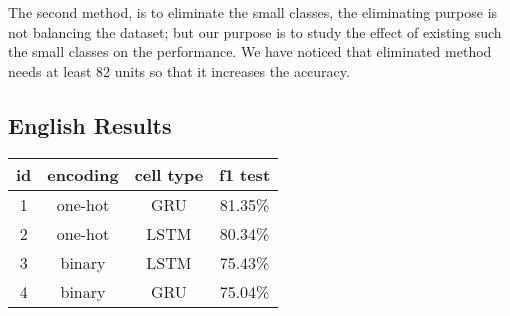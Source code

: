   
The second method, is to eliminate the small classes, the eliminating purpose is
not balancing the dataset; but our purpose is to study the effect of existing
such the small classes on the performance. We have noticed that eliminated
method needs at least 82 units so that it increases the accuracy.











\subsection*{English Results}
\begin{center}
 \begin{tabular}{c c c c} 
     \toprule
     \textbf{id} & \textbf{encoding } & \textbf{cell type} & \textbf{f1 test}\\
     \midrule
     1 & one-hot & GRU  & 81.35\%\\ %
     2 & one-hot & LSTM & 80.34\%\\ %
     3 & binary  & LSTM & 75.43\%\\ %
     4 & binary  & GRU  & 75.04\%\\ %

     \bottomrule
 \end{tabular}
\label{eng-results}
\end{center}

